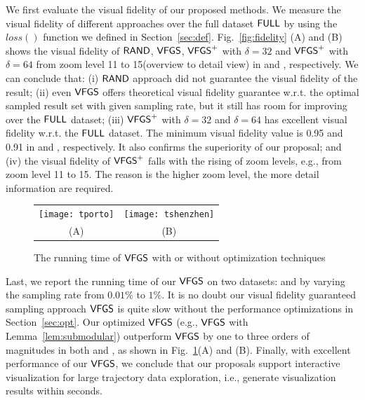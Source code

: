 We first evaluate the visual fidelity of our proposed methods.
We measure the visual fidelity of different approaches over the full dataset $\mathsf{FULL}$ by using the $loss()$ function we defined in Section~\ref{sec:def}.
Fig.~\ref{fig:fidelity} (A) and (B) shows the visual fidelity of $\mathsf{RAND}$, $\mathsf{VFGS}$, $\mathsf{VFGS}^{+}$ with $\delta=32$ and $\mathsf{VFGS}^{+}$ with $\delta=64$ from zoom level 11 to 15(overview to detail view) in
\pt{} and \sz{}, respectively.
We can conclude that: (i) $\mathsf{RAND}$ approach did not guarantee the visual fidelity of the result;
(ii) even $\mathsf{VFGS}$ offers theoretical visual fidelity guarantee w.r.t. the optimal sampled result set with given sampling rate, but it still has room for improving over the $\mathsf{FULL}$ dataset;
(iii) $\mathsf{VFGS}^{+}$ with $\delta=32$ and $\delta=64$ has excellent visual fidelity w.r.t. the $\mathsf{FULL}$ dataset. The minimum visual fidelity value is 0.95 and 0.91 in \pt{} and \sz{}, respectively.
It also confirms the superiority of our proposal;
and (iv) the visual fidelity of $\mathsf{VFGS}^{+}$ falls with the rising of zoom levels, e.g., from zoom level 11 to 15.
The reason is the higher zoom level, the more detail information are required.


\begin{figure}
 \centering
 \small
 \begin{tabular}{cc}
   \texttt{[image: tporto]}
   &
   \texttt{[image: tshenzhen]}
   \\
   (A) \pt{}
   &
   (B) \sz{}
 \end{tabular}
 \vspace{-2mm}
 \caption{The running time of $\mathsf{VFGS}$ with or without optimization techniques}
 \label{fig:cost}
 \vspace{-4mm}
\end{figure}


Last, we report the running time of our $\mathsf{VFGS}$ on two datasets: \pt{} and \sz{} by varying the sampling rate from $0.01\%$ to $1\%$.
It is no doubt our visual fidelity guaranteed sampling approach $\mathsf{VFGS}$ is quite slow without the performance optimizations in Section~\ref{sec:opt}.
Our optimized $\mathsf{VFGS}$ (e.g., $\mathsf{VFGS}$ with Lemma~\ref{lem:submodular}) outperform $\mathsf{VFGS}$ by one to three orders of magnitudes in both \pt{} and \sz{}, as shown in Fig.~\ref{fig:cost}(A) and (B).
Finally, with excellent performance of our $\mathsf{VFGS}$, we conclude that our proposals support interactive visualization for large trajectory data exploration, i.e., generate visualization results within seconds.

